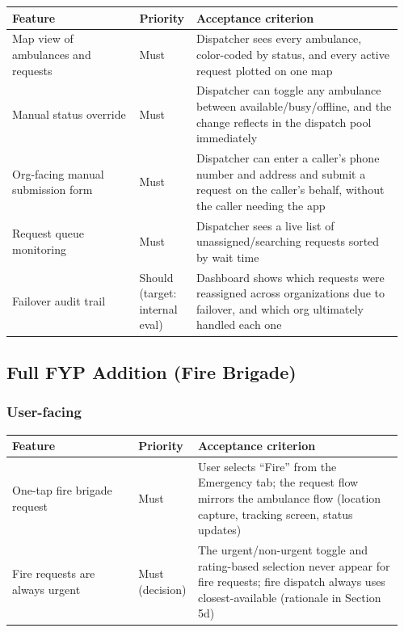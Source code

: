 \documentclass[11pt,a4paper]{article}
\begin{document}
\begin{longtable}{p{0.32\linewidth} p{0.12\linewidth} p{0.52\linewidth}}
\toprule
\textbf{Feature} & \textbf{Priority} & \textbf{Acceptance criterion} \\
\midrule
\endhead
Map view of ambulances and requests & Must & Dispatcher sees every ambulance, color-coded by status, and every active request plotted on one map \\
\addlinespace
Manual status override & Must & Dispatcher can toggle any ambulance between available/busy/offline, and the change reflects in the dispatch pool immediately \\
\addlinespace
Org-facing manual submission form & Must & Dispatcher can enter a caller's phone number and address and submit a request on the caller's behalf, without the caller needing the app \\
\addlinespace
Request queue monitoring & Must & Dispatcher sees a live list of unassigned/searching requests sorted by wait time \\
\addlinespace
Failover audit trail & Should (target: internal eval) & Dashboard shows which requests were reassigned across organizations due to failover, and which org ultimately handled each one \\
\bottomrule
\end{longtable}

\subsection{Full FYP Addition (Fire Brigade)}

\subsubsection{User-facing}

\begin{longtable}{p{0.32\linewidth} p{0.12\linewidth} p{0.52\linewidth}}
\toprule
\textbf{Feature} & \textbf{Priority} & \textbf{Acceptance criterion} \\
\midrule
\endhead
One-tap fire brigade request & Must & User selects ``Fire'' from the Emergency tab; the request flow mirrors the ambulance flow (location capture, tracking screen, status updates) \\
\addlinespace
Fire requests are always urgent & Must (decision) & The urgent/non-urgent toggle and rating-based selection never appear for fire requests; fire dispatch always uses closest-available (rationale in Section 5d) \\
\bottomrule
\end{longtable}
\end{document}
